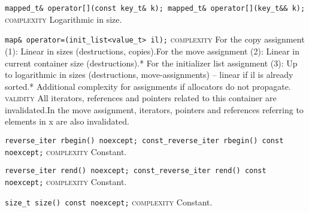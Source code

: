 \noindent{}\hspace*{0.25em}\lstinline[basicstyle=\ttfamily\color{clime}]{mapped_t& operator[](const key_t& k); mapped_t& operator[](key_t&& k);} \textsc{complexity} Logarithmic in size.\\\vspace{-0.6em}

\noindent{}\hspace*{0.25em}\lstinline[basicstyle=\ttfamily\color{corange}]{map& operator=(init_list<value_t> il);} \textsc{complexity} For the copy assignment (1): Linear in sizes (destructions, copies).For the move assignment (2): Linear in current container size (destructions).* For the initializer list assignment (3): Up to logarithmic in sizes (destructions, move-assignments) -- linear if il is already sorted.* Additional complexity for assignments if allocators do not propagate. \textsc{validity} All iterators, references and pointers related to this container are invalidated.In the move assignment, iterators, pointers and references referring to elements in x are also invalidated.\\\vspace{-0.6em}

\noindent{}\hspace*{0.25em}\lstinline[basicstyle=\ttfamily\color{cgreen}]{reverse_iter rbegin() noexcept; const_reverse_iter rbegin() const noexcept;} \textsc{complexity} Constant.\\\vspace{-0.6em}

\noindent{}\hspace*{0.25em}\lstinline[basicstyle=\ttfamily\color{cgreen}]{reverse_iter rend() noexcept; const_reverse_iter rend() const noexcept;} \textsc{complexity} Constant.\\\vspace{-0.6em}

\noindent{}\hspace*{0.25em}\lstinline[basicstyle=\ttfamily\color{cgreen}]{size_t size() const noexcept;} \textsc{complexity} Constant.\\\vspace{-0.6em}

